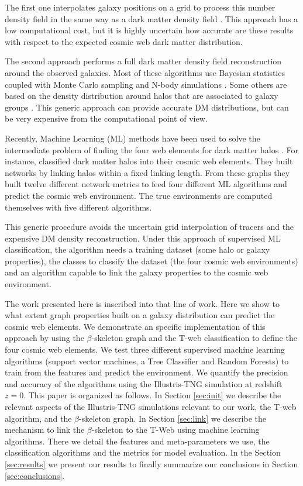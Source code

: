 \documentclass[usenatbib]{mnras}
\begin{document}
The first one interpolates galaxy positions on a grid to process
this number density field in the same way as a dark matter density
field \citep{Eardley2015,Alpaslan2016,Tojeiro2017,Shadab2019}.
This approach has a low computational cost, but it is highly uncertain
how accurate are these results with respect to the expected  cosmic
web dark matter distribution. 

The second approach performs a full dark matter density field
reconstruction around the observed galaxies.
Most of these algorithms use Bayesian statistics coupled with Monte
Carlo sampling  and N-body
simulations \citep{Jasche2010,Jasche2013a,Bos2014,LeclercqJasche2015,Horowitz2019,Burchett2020}. 
Some others are based on the density distribution around halos that
are associated to galaxy groups \citep{Wang2009,2011MNRAS.417.1303M}.  
This generic approach can provide accurate DM distributions, but can
be very expensive from the computational point of view. 

Recently, Machine Learning (ML) methods have been used to solve the
intermediate problem of finding the four web elements for dark matter
halos \citep{Hui2018,Tsizh2019}.
For instance, \cite{Tsizh2019} classified
dark  matter halos into their cosmic web elements. 
They built networks by linking halos within a fixed linking length.
From these graphs they built twelve different network metrics to feed
four different ML algorithms and predict the cosmic web
environment. 
The true environments are computed themselves with five different
algorithms.  

This generic procedure avoids the uncertain grid interpolation of
tracers and the expensive DM density reconstruction. 
Under this approach of supervised ML classification, 
the algorithm needs a training dataset (some halo or galaxy
properties), the classes to classify the dataset (the four cosmic web
environments) and an algorithm capable to link the galaxy properties
to the cosmic web environment. 

The work presented here is inscribed into that line of work.
Here we show to what extent graph properties built on a galaxy
distribution can predict the cosmic web elements.
We demonstrate an specific implementation of this approach by using
the $\beta$-skeleton graph \citep{Fang2019} and the  T-web
\citep{Forero-Romero2009} classification to define the four cosmic web
elements.  
We test three different supervised machine learning
algorithms (support vector machines, a Tree Classifier and Random Forests) 
to train from the features and predict the environment.
We quantify the precision and accuracy of the algorithms using the
Illustris-TNG simulation \citep{Nelson2015} at redshift $z=0$. 
This paper is organized as follows. 
In Section \ref{sec:init} we describe the relevant aspects of the Illustris-TNG
simulations relevant to our work, the T-web algorithm,
and the $\beta$-skeleton graph.
In Section \ref{sec:link} we describe the mechanism to link the
$\beta$-skeleton to the T-Web using machine learning algorithms.
There we detail the features and meta-parameters we use, the
classification algorithms and the metrics for model evaluation.  
In the Section \ref{sec:results} we present our results
to finally summarize our conclusions in Section
\ref{sec:conclusions}.
\end{document}
